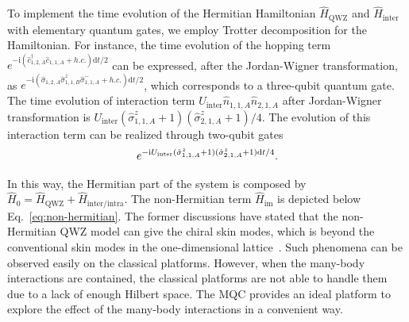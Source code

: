 \documentclass[longbibliography, aps, prx, amsmath, amssymb, amsfonts, twocolumn,superscriptaddress, footinbib]{revtex4-1}
\begin{document}
	To implement the time evolution of the Hermitian Hamiltonian $\hat{H}_{\text{QWZ}}$ and $\hat{H}_{\text{inter}}$ with elementary quantum gates, we employ Trotter decomposition for the Hamiltonian. For instance, the time evolution of the hopping term $e^{-\mathrm{i}  (\hat{c}_{1,2,A}^{\dagger} \hat{c}_{1,1,A} +h.c.)\mathrm{d} t/2}$ can be expressed, after the Jordan-Wigner transformation, as $e^{-\mathrm{i} (\hat{\sigma}_{1,2,A} \hat{\sigma}^z_{1,1,B}\hat{\sigma}_{1,1,A}^{-} +h.c.)\mathrm{d} t /2}$, which corresponds to a three-qubit quantum gate.
	The time evolution of interaction term $ U_{\text{inter}} \hat{n}_{1, 1, A} \hat{n}_{2,1,A}$ after Jordan-Wigner transformation is $U_{\text{inter}} (\hat{\sigma}^z_{1,1,A}+1)(\hat{\sigma}^z_{2,1,A}+1)/4$. The evolution of this interaction term can be realized through two-qubit gates 
	\begin{equation}
		e^{-\mathrm{i} U_{\text{inter}} (\hat{\sigma}^z_{1,1,A}+1) (\hat{\sigma}^z_{2,1,A}+1) \mathrm{d}t/4 }. \notag
	\end{equation}

	In this way, the Hermitian part of the system is composed by $\hat{H}_0=\hat{H}_{\text{QWZ}}+\hat{H}_{\text{inter/intra}}$. The non-Hermitian term $\hat{H}_{\text{im}}$ is depicted below Eq.~\eqref{eq:non-hermitian}. The former discussions have stated that the non-Hermitian QWZ model can give the chiral skin modes, which is beyond the conventional skin modes in the one-dimensional lattice~\cite{nakamura2023universal, ma2024non,schindler2023hermitian}. Such phenomena can be observed easily on the classical platforms. However, when the many-body interactions are contained, the classical platforms are not able to handle them due to a lack of enough Hilbert space. The MQC provides an ideal platform to explore the effect of the many-body interactions in a convenient way.

\end{document}
